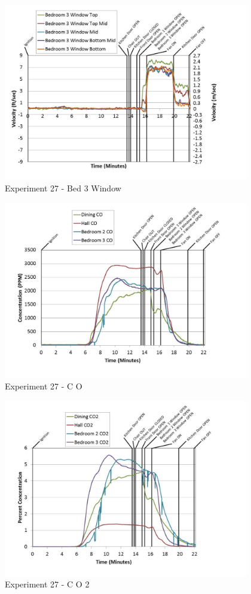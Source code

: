 \documentclass{article}
\begin{document}
\begin{appendices}
	\clearpage

	\begin{figure}[h!]
		\centering
		\includegraphics[height=3.05in]{0_Images/Results_Charts/Exp_27_Charts/Bed3Window.pdf}
		\caption{Experiment 27 - Bed 3 Window}
	\end{figure}
 

	\begin{figure}[h!]
		\centering
		\includegraphics[height=3.05in]{0_Images/Results_Charts/Exp_27_Charts/CO.pdf}
		\caption{Experiment 27 - C O}
	\end{figure}
 
	\clearpage

	\begin{figure}[h!]
		\centering
		\includegraphics[height=3.05in]{0_Images/Results_Charts/Exp_27_Charts/CO2.pdf}
		\caption{Experiment 27 - C O 2}
	\end{figure}
 


\end{appendices}
\end{document}

